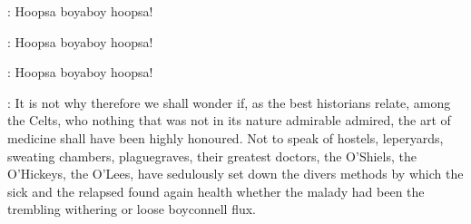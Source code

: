 \documentclass[12pt]{article}
\begin{document}
\Nurses: Hoopsa boyaboy hoopsa!

\Nurses: Hoopsa boyaboy hoopsa!

\Nurses: Hoopsa boyaboy hoopsa!

%
%


: It is not why therefore we shall wonder if, as the best historians
relate, among the Celts, who nothing that was not in its nature admirable
admired, the art of medicine shall have been highly honoured. Not to speak
of hostels, leperyards, sweating chambers, plaguegraves, their greatest
doctors, the O'Shiels, the O'Hickeys, the O'Lees, have sedulously set down
the divers methods by which the sick and the relapsed found again health
whether the malady had been the trembling withering or loose boyconnell
flux.
\end{document}
